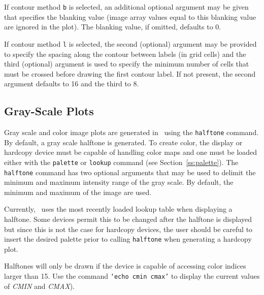 If contour method {\tt b} is selected, an additional optional argument may be
given that specifies the blanking value (image array values equal to this
blanking value are ignored in the plot).
The blanking value, if omitted, defaults to 0.

If contour method {\tt l} is selected, the second (optional) argument may be
provided to specify the spacing along the contour between labels
(in grid cells) and the third (optional) argument is used to specify
the minimum number of cells that must be crossed before drawing
the first contour label.
If not present, the second argument defaults to 16 and the third to 8.

\subsection*		{Gray-Scale Plots}

Gray scale and color image plots are generated in \wip\ using the
{\tt halftone}%
%
command.
By default, a gray scale halftone is generated.
To create color, the display or hardcopy device must be capable of
handling color maps and one must be loaded either with the
{\tt palette}%
%
or
{\tt lookup}%
%
command (see Section~\ref{ss:palette}).
The {\tt halftone} command has two optional arguments that
may be used to delimit the minimum and maximum intensity range
of the gray scale.
By default, the minimum and maximum of the image are used.

Currently, \wip\ uses the most recently loaded lookup table
when displaying a halftone.
Some devices permit this to be changed after the halftone
is displayed but since this is not the case for hardcopy devices,
the user should be careful to insert the desired palette prior to
calling {\tt halftone} when generating a hardcopy plot.

Halftones will only be drawn if the device
is capable of accessing color indices
larger than 15.
Use the command {\tt `echo cmin cmax'}%
to display the current
values of {\em CMIN} and {\em CMAX}).

